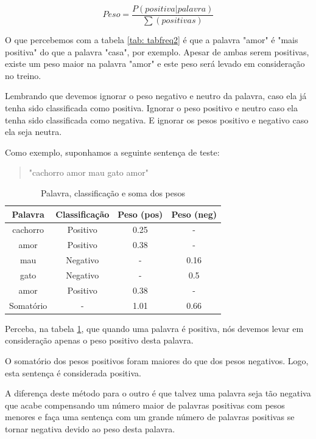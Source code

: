 \documentclass[
article,			%
12pt,				%
a4paper,			%
english,			%
brazil,				%
sumario=tradicional,
twoside
]{abntex2}
\begin{document}
	\begin{equation}
	Peso = \frac{P(positiva|palavra)}{\sum(positivas)}
	\end{equation}
	
	O que percebemos com a tabela \ref{tab: tabfreq2} é que a palavra "amor"  é "mais positiva"  do que a palavra "casa", por exemplo. Apesar de ambas serem positivas, existe um peso maior na palavra "amor" e este peso será levado em consideração no treino.

	Lembrando que devemos ignorar o peso negativo e neutro da palavra, caso ela já tenha sido classificada como positiva. Ignorar o peso positivo e neutro caso ela tenha sido classificada como negativa. E ignorar os pesos positivo e negativo caso ela seja neutra.
	 
	Como exemplo, suponhamos a seguinte sentença de teste:
	\begin{quote}
		"cachorro amor mau gato amor"
	\end{quote}
    
    
	\begin{table}[!h]
		\caption{Palavra, classificação e soma dos pesos}
		\label{tab: tabfreq3}
		\centering
		
		\begin{tabular}{|c|c|c|c|} \hline
			\textbf{Palavra} & \textbf{Classificação} & \textbf{Peso (pos)} & \textbf{Peso (neg)}\\
			\hline
			cachorro & Positivo & 0.25 & -\\
			amor & Positivo & 0.38 & - \\
			mau & Negativo & - & 0.16\\
			gato & Negativo & - & 0.5\\
			amor & Positivo & 0.38 & -\\
			\hline
			Somatório & - & 1.01 & 0.66 \\
			\hline
			
		\end{tabular}
		
	\end{table}	
	
	Perceba, na tabela \ref{tab: tabfreq3}, que quando uma palavra é positiva, nós devemos levar em consideração apenas o peso positivo desta palavra. 
	
	O somatório dos pesos positivos foram maiores do que dos pesos negativos. 
	Logo, esta sentença é considerada positiva.
	
	A diferença deste método para o outro é que talvez uma palavra seja tão negativa que acabe compensando um número maior de palavras positivas com pesos menores e faça uma sentença com um grande número de palavras positivas se tornar negativa devido ao peso desta palavra.
	
\end{document}
